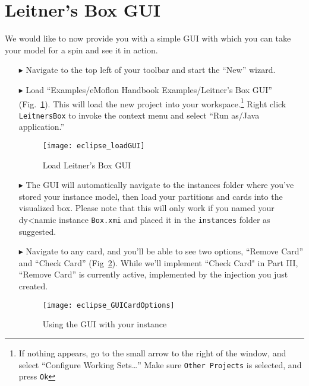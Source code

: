 \newpage
\section{Leitner's Box GUI}
\genHeader

We would like to now provide you with a simple GUI with which you can take your model for a spin and see it in action.

\begin{itemize}

\item[$\blacktriangleright$] Navigate to the top left of your toolbar and start the ``New'' wizard.

\item[$\blacktriangleright$] Load ``Examples/eMoflon Handbook Examples/Leitner's Box GUI'' (Fig.~\ref{fig:GUI_load}). This will load the new project into
your workspace.\footnote{If nothing appears, go to the small arrow to the right of the window, and select ``Configure Working Sets\ldots'' Make sure
\texttt{Other Projects} is selected, and press \texttt{Ok}} Right click \texttt{LeitnersBox} to invoke the context menu and select ``Run as/Java application.''

\begin{figure}[htbp]
    \centering
    \texttt{[image: eclipse\_loadGUI]}
    \caption{Load Leitner's Box GUI}
    \label{fig:GUI_load}
\end{figure}

\clearpage

\item[$\blacktriangleright$] The GUI will automatically navigate to the instances folder where you've stored your instance model, then load your partitions and
cards into the visualized box. Please note that this will only work if you named your dy<namic instance \texttt{Box.xmi} and placed it in the \texttt{instances}
folder as suggested.

\vspace{1cm}

\item[$\blacktriangleright$] Navigate to any card, and you'll be able to see two options, ``Remove Card'' and ``Check Card'' (Fig~\ref{fig:GUI_cardOptions}).
While we'll implement ``Check Card" in Part III, ``Remove Card'' is currently active, implemented by the injection you just created.

\vspace{1cm}

\begin{figure}[htbp]
    \centering
    \texttt{[image: eclipse\_GUICardOptions]}
    \caption{Using the GUI with your instance}
    \label{fig:GUI_cardOptions}
\end{figure}


\end{itemize}
